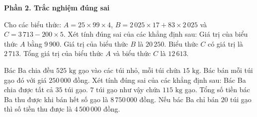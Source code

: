 \textbf{Phần 2. Trắc nghiệm đúng sai}

\begin{ex} %
Cho các biểu thức: $A = 25 \times 99 \times 4$, $B = 2\,025 \times 17 + 83 \times 2\,025$ và $C = 3\,713 - 200 \times 5$. Xét tính đúng sai của các khẳng định sau:
\choiceTF
{\True Giá trị của biểu thức $A$ bằng $9\,900$.}
{Giá trị của biểu thức $B$ là $20\,250$.}
{\True Biểu thức $C$ có giá trị là $2\,713$.}
{\True Tổng giá trị của biểu thức $A$ và biểu thức $C$ là $12\,613$.}
\end{ex}

\begin{ex} %
Bác Ba chia đều $525\text{ kg}$ gạo vào các túi nhỏ, mỗi túi chứa $15\text{ kg}$. Bác bán mỗi túi gạo đó với giá $250\,000$ đồng. Xét tính đúng sai của các khẳng định sau:
\choiceTF
{\True Bác Ba chia được tất cả $35$ túi gạo.}
{$7$ túi gạo như vậy chứa $115\text{ kg}$ gạo.}
{\True Tổng số tiền bác Ba thu được khi bán hết số gạo là $8\,750\,000$ đồng.}
{Nếu bác Ba chỉ bán $20$ túi gạo thì số tiền thu được là $4\,500\,000$ đồng.}
\end{ex}

